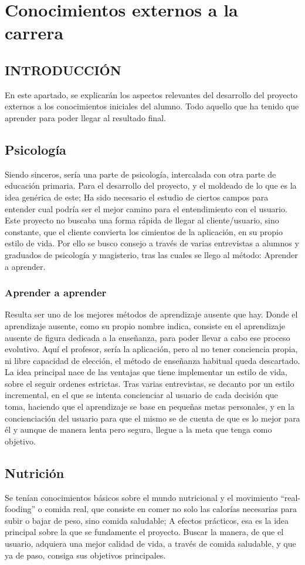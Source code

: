 \section{Conocimientos externos a la carrera}
\subsection{INTRODUCCIÓN}
En este apartado, se explicarán los aspectos relevantes del desarrollo del proyecto externos a los conocimientos iniciales del alumno. Todo aquello que ha tenido que aprender para poder llegar al resultado final.
\subsection{Psicología}
Siendo sinceros, sería una parte de psicología, intercalada con otra parte de educación primaria. Para el desarrollo del proyecto, y el moldeado de lo que es la idea genérica de este; Ha sido necesario el estudio de ciertos campos para entender cual podría ser el mejor camino para el entendimiento con el usuario. Este proyecto no buscaba una forma rápida de llegar al cliente/usuario, sino constante, que el cliente convierta los cimientos de la aplicación, en su propio estilo de vida. Por ello se busco consejo a través de varias entrevistas a alumnos y graduados de psicología y magisterio, tras las cuales se llego al método: Aprender a aprender.
\subsubsection{Aprender a aprender}
Resulta ser uno de los mejores métodos de aprendizaje ausente que hay. Donde el aprendizaje ausente, como su propio nombre indica, consiste en el aprendizaje ausente de figura dedicada a la enseñanza, para poder llevar a cabo ese proceso evolutivo. Aquí el profesor, sería la aplicación, pero al no tener conciencia propia, ni libre capacidad de elección, el método de enseñanza habitual queda descartado. \\
La idea principal nace de las ventajas que tiene implementar un estilo de vida, sobre el seguir ordenes estrictas. Tras varias entrevistas, se decanto por un estilo incremental, en el que se intenta concienciar al usuario de cada decisión que toma, haciendo que el aprendizaje se base en pequeñas metas personales, y en la concienciación del usuario para que el mismo se de cuenta de que es lo mejor para él y aunque de manera lenta pero segura, llegue a la meta que tenga como objetivo.
\subsection{Nutrición}
Se tenían conocimientos básicos sobre el mundo nutricional y el movimiento “real-fooding”  o comida real, que consiste en comer no solo las calorías necesarias para subir o bajar de peso, sino comida saludable; A efectos prácticos, esa es la idea principal sobre la que se fundamente el proyecto. Buscar la manera, de que el usuario, adquiera una mejor calidad de vida, a través de comida saludable, y que ya de paso, consiga sus objetivos principales.
